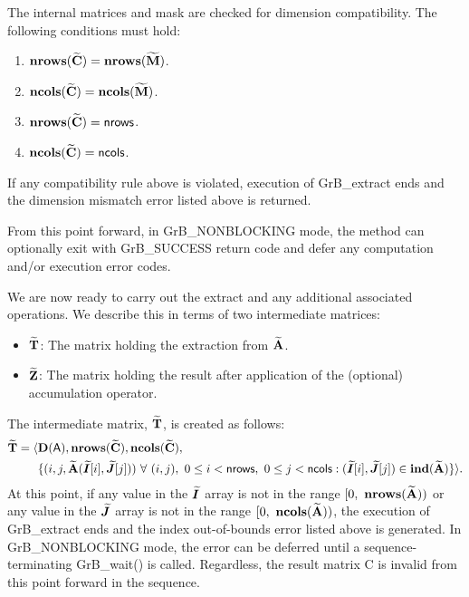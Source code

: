 The internal matrices and mask are checked for dimension compatibility. The following
conditions must hold:
\begin{enumerate}
    \item $\bold{nrows}({\bf \widetilde{C}}) = \bold{nrows}({\bf \widetilde{M}})$.

    \item $\bold{ncols}({\bf \widetilde{C}}) = \bold{ncols}({\bf \widetilde{M}})$.

    \item $\bold{nrows}({\bf \widetilde{C}}) = {\sf nrows}$.

    \item $\bold{ncols}({\bf \widetilde{C}}) = {\sf ncols}$.
\end{enumerate}
If any compatibility rule above is violated, execution of {\sf GrB\_extract} ends and
the dimension mismatch error listed above is returned.

From this point forward, in {\sf GrB\_NONBLOCKING} mode, the method can 
optionally exit with {\sf GrB\_SUCCESS} return code and defer any computation 
and/or execution error codes.

We are now ready to carry out the extract and any additional 
associated operations.  We describe this in terms of two intermediate matrices:
\begin{itemize}
    \item ${\bf \widetilde{T}}$: The matrix holding the extraction from 
    ${\bf \widetilde{A}}$.

    \item ${\bf \widetilde{Z}}$: The matrix holding the result after 
    application of the (optional) accumulation operator.
\end{itemize}

The intermediate matrix, ${\bf \widetilde{T}}$, is created as follows:
\[
\begin{aligned}
\matrix{\widetilde{T}} = \langle & \bold{D}({\sf A}),
                           \bold{nrows}(\matrix{\widetilde{C}}), 
                           \bold{ncols}(\matrix{\widetilde{C}}), \\
                         & %
\{(i,j,\matrix{\widetilde{A}}(\grbarray{\widetilde{I}}[i],\grbarray{\widetilde{J}}[j])) 
\ \forall \ (i,j), \ 0 \leq i < {\sf nrows}, \ 0 \leq j < {\sf ncols} :
(\grbarray{\widetilde{I}}[i], \grbarray{\widetilde{J}}[j]) \in 
\bold{ind}(\matrix{\widetilde{A}}) \} \rangle.
\end{aligned}
\]
At this point, if any value in the $\bm{\widetilde{I}}$ array is not in
the range $[0,\ \bold{nrows}({\bf \widetilde{A}}) )$ or any value in the 
$\bm{\widetilde{J}}$ array is not in the range 
$[0,\ \bold{ncols}({\bf \widetilde{A}}))$, the execution of {\sf GrB\_extract} 
ends and the index out-of-bounds error listed above is generated.  In 
{\sf GrB\_NONBLOCKING} mode, the error can be deferred until a 
sequence-terminating {\sf GrB\_wait()} is called.  Regardless, the result 
matrix {\sf C} is invalid from this point forward in the sequence.

